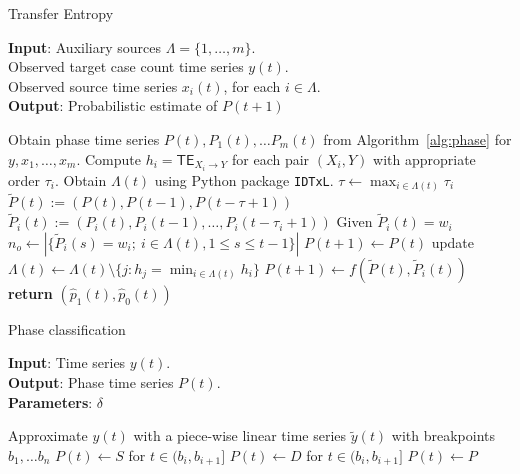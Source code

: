 \documentclass[conference,compsoc]{IEEEtran}
\begin{document}


\begin{algorithm}[!t]
\caption{Transfer Entropy}
\label{alg:TE}
\textbf{Input}:  Auxiliary sources $\Lambda =\{1, \dots, m\}.$\\
Observed target case count time series $y(t)$.\\
Observed source time series $x_i(t)$, for each $i\in\Lambda$.\\
\textbf{Output}: Probabilistic estimate of $P(t+1)$\\
\begin{algorithmic}[1]
\STATE Obtain phase time series  $P(t), P_1(t), \dots P_m(t)$ from Algorithm~\ref{alg:phase} for $y, x_1, \dots, x_m$.
\STATE Compute $h_i = \mathsf{TE}_{X_i\to Y}$ for each pair $(X_i, Y)$ with appropriate order $\tau_i$.
\STATE Obtain $\Lambda(t)$ using Python package \verb|IDTxL|.
  \STATE $\tau \gets \max_{i\in\Lambda(t)} \tau_i$\\
  $\tilde P(t) := (P(t), P(t-1), P(t-\tau+1))$
  \STATE $\tilde P_i(t) := (P_i(t), P_i(t-1), \dots,  P_i(t-\tau_i+1))$
  \ENDFOR
  \STATE Given  $\tilde P_i(t) = w_i$ \\
  $n_o \gets |\{\tilde P_i(s) =  w_i;~ i\in \Lambda(t), 1\leq s\leq t-1\}|$
    \STATE $P(t+1) \gets P(t)$
  \ELSE
    \STATE update $\Lambda(t) \gets \Lambda(t)\setminus \{j: h_j = \min_{i\in \Lambda(t)} h_i\}$
  \ENDWHILE
    \STATE $P(t+1) \gets f(\tilde P(t), \tilde P_i(t)) $
  \ENDIF
 \STATE \textbf{return}  $(\hat p_1(t), \hat p_0(t)) $
\end{algorithmic}
\end{algorithm}


\begin{algorithm}[ht]
\caption{Phase classification}
\label{alg:phase}
\textbf{Input}:  Time series $y(t)$.\\
\textbf{Output}:  Phase time series  $P(t)$.\\
\textbf{Parameters}: $\delta$
\begin{algorithmic}[1]
\STATE Approximate $y(t)$ with a piece-wise linear time series $\tilde y(t)$ with breakpoints $b_1, \dots b_n$
    \STATE $P(t) \gets S$ for $t\in (b_i, b_{i+1}]$
  \ELSE {}
    \STATE $P(t) \gets D$ for $t\in (b_i, b_{i+1}]$
    \ELSE 
    \STATE $P(t) \gets P$
  \ENDIF
      \ENDIF
\end{algorithmic}
\end{algorithm}
\end{document}
